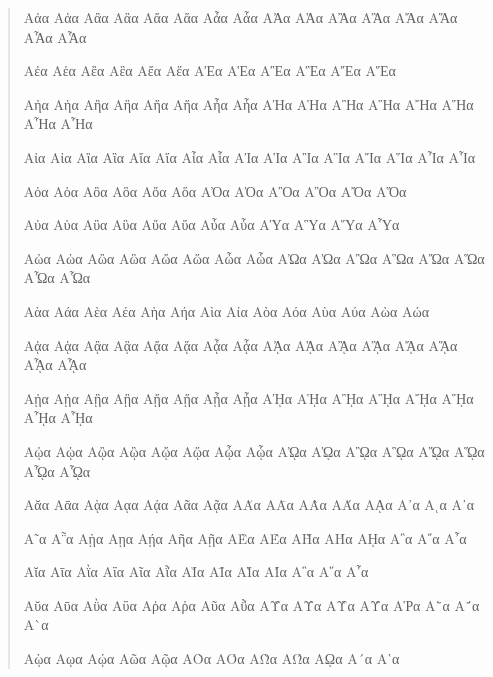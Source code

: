 \documentclass[a4paper]{article}
\begin{document}
\begin{quote}
  \greekscript

Αἀα Αἁα Αἂα Αἃα Αἄα Αἅα Αἆα Αἇα ΑἈα ΑἉα ΑἊα ΑἋα ΑἌα ΑἍα ΑἎα ΑἏα

Αἐα Αἑα Αἒα Αἓα Αἔα Αἕα ΑἘα ΑἙα ΑἚα ΑἛα ΑἜα ΑἝα

Αἠα Αἡα Αἢα Αἣα Αἤα Αἥα Αἦα Αἧα ΑἨα ΑἩα ΑἪα ΑἫα ΑἬα ΑἭα ΑἮα ΑἯα

Αἰα Αἱα Αἲα Αἳα Αἴα Αἵα Αἶα Αἷα ΑἸα ΑἹα ΑἺα ΑἻα ΑἼα ΑἽα ΑἾα ΑἿα

Αὀα Αὁα Αὂα Αὃα Αὄα Αὅα ΑὈα ΑὉα ΑὊα ΑὋα ΑὌα ΑὍα

Αὐα Αὑα Αὒα Αὓα Αὔα Αὕα Αὖα Αὗα ΑὙα ΑὛα ΑὝα ΑὟα

Αὠα Αὡα Αὢα Αὣα Αὤα Αὥα Αὦα Αὧα ΑὨα ΑὩα ΑὪα ΑὫα ΑὬα ΑὭα ΑὮα ΑὯα

Αὰα Αάα Αὲα Αέα Αὴα Αήα Αὶα Αία Αὸα Αόα Αὺα Αύα Αὼα Αώα

Αᾀα Αᾁα Αᾂα Αᾃα Αᾄα Αᾅα Αᾆα Αᾇα Αᾈα Αᾉα Αᾊα Αᾋα Αᾌα Αᾍα Αᾎα Αᾏα

Αᾐα Αᾑα Αᾒα Αᾓα Αᾔα Αᾕα Αᾖα Αᾗα Αᾘα Αᾙα Αᾚα Αᾛα Αᾜα Αᾝα Αᾞα Αᾟα

Αᾠα Αᾡα Αᾢα Αᾣα Αᾤα Αᾥα Αᾦα Αᾧα Αᾨα Αᾩα Αᾪα Αᾫα Αᾬα Αᾭα Αᾮα Αᾯα

Αᾰα Αᾱα Αᾲα Αᾳα Αᾴα Αᾶα Αᾷα ΑᾸα ΑᾹα ΑᾺα ΑΆα Αᾼα Α᾽α Αια Α᾿α

Α῀α Α῁α Αῂα Αῃα Αῄα Αῆα Αῇα ΑῈα ΑΈα ΑῊα ΑΉα Αῌα Α῍α Α῎α Α῏α

Αῐα Αῑα Αῒα Αΐα Αῖα Αῗα ΑῘα ΑῙα ΑῚα ΑΊα Α῝α Α῞α Α῟α

Αῠα Αῡα Αῢα Αΰα Αῤα Αῥα Αῦα Αῧα ΑῨα ΑῩα ΑῪα ΑΎα ΑῬα Α῭α Α΅α Α`α

Αῲα Αῳα Αῴα Αῶα Αῷα ΑῸα ΑΌα ΑῺα ΑΏα Αῼα Α´α Α῾α

\end{quote}
\end{document}
